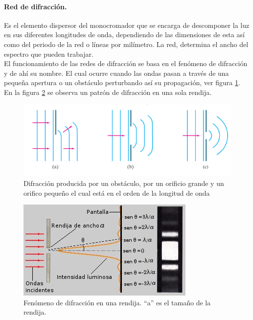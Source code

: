 \paragraph{Red de difracción.} Es el elemento dispersor del monocromador que se encarga de descomponer la luz en sus diferentes longitudes de onda, dependiendo de las dimensiones de esta así como del periodo de la red o líneas por milímetro. La red, determina el ancho del espectro que pueden trabajar.\\ 
El funcionamiento de las redes de difracción se basa en el fenómeno de difracción y de ahí su nombre. El cual ocurre cuando las ondas pasan a través de una pequeña apertura o un obstáculo perturbando así su propagación, ver figura \ref{fig:difraccion}. En la figura \ref{fig:slit2} se observa un patrón de difracción en una sola rendija.
\begin{figure}[h]
	\centering
	\includegraphics[width=0.9\linewidth]{Imagenes/difraccion}
	\caption{Difracción producida por un obstáculo, por un orificio grande y un orifico pequeño el cual está en el orden de la longitud de onda \cite{Oliver2013a}} %
	\label{fig:difraccion}
\end{figure}
\begin{figure}[h]
	\centering
	\includegraphics[width=0.7\linewidth]{Imagenes/patronrendijasimple}
	\caption{Fenómeno de difracción en una rendija. ``a'' es el tamaño de la rendija. \cite{longitud01}}
	\label{fig:slit2}
\end{figure} 

